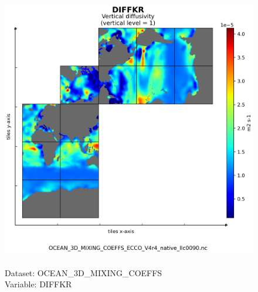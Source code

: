 \begin{figure}[H]
\centering
\includegraphics[scale=0.5]{../images/plots/native_plots/Ocean_3D_Gent-Mcwilliams_Redi_and_Background_Vertical_Diffusivity_Coefficients_for_the_Lat-Lon-Cap_90_(llc90)_Native_Model_Grid_(Version_4_Release_4)/DIFFKR.png}
\caption{\\Dataset: OCEAN\_3D\_MIXING\_COEFFS\\Variable: DIFFKR}
\label{tab:table-OCEAN_3D_MIXING_COEFFS_DIFFKR-Plot}
\end{figure}
\pagebreak
